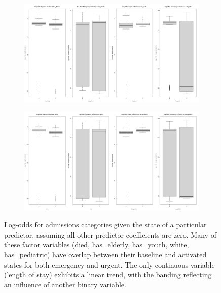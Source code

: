 \documentclass[11pt]{article}
\begin{document}
\begin{figure}[ht]
    \begin{subfigure}[b]{0.45\textwidth}
        \centering
        \includegraphics[width=\textwidth]{img/log_odds_3.png}
    \end{subfigure}
    \hfill
    \begin{subfigure}[b]{0.45\textwidth}
        \centering
        \includegraphics[width=\textwidth]{img/log_odds_4.png}
    \end{subfigure}

    \caption{Log-odds for admissions categories given the state of a particular predictor, assuming all other predictor coefficients are zero. Many of these factor variables (died, has\_elderly, has\_youth, white, has\_pediatric) have overlap between their baseline and activated states for both emergency and urgent. The only continuous variable (length of stay) exhibits a linear trend, with the banding reflecting an influence of another binary variable.}
    \label{fig:log_odds_grid}
\end{figure}
\end{document}

